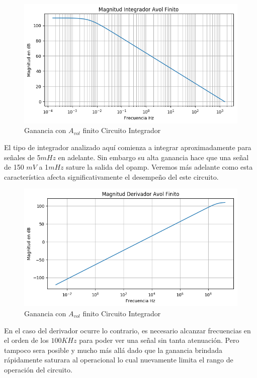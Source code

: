 \documentclass[a4paper]{article}
\begin{document}
\begin{figure}[H]
	\centering
	\includegraphics[width=\textwidth]{Ejercicio4/BODE-AVOL-FINITO-MAGNITUD-INTEGRADOR}
	\caption{Ganancia con $A_{vol}$ finito Circuito Integrador}
\end{figure}
El tipo de integrador analizado aquí comienza a integrar aproximadamente para señales de 5$mHz$ en adelante. Sin embargo su alta ganancia hace que una señal de 150 $mV$ a 1$mHz$ sature la salida del opamp. Veremos más adelante como esta característica afecta significativamente el desempeño del este circuito.
\begin{figure}[H]
	\centering
	\includegraphics[width=\textwidth]{Ejercicio4/BODE-AVOL-FINITO-MAGNITUD-DERIVADOR}
	\caption{Ganancia con $A_{vol}$ finito Circuito Integrador}
\end{figure}

En el caso del derivador ocurre lo contrario, es necesario alcanzar frecuencias en el orden de los $100KHz$ para poder ver una señal sin tanta atenuación. Pero tampoco sera posible y mucho más allá dado que la ganancia brindada rápidamente saturara al operacional lo cual nuevamente limita el rango de operación del circuito. 
\end{document}
